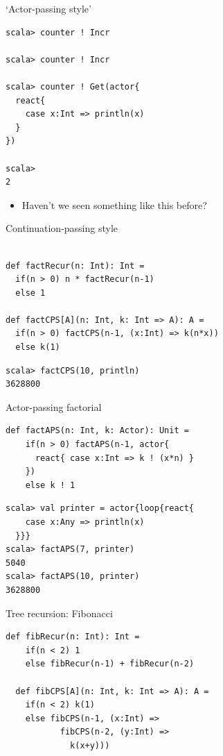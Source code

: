 \documentclass[14pt,t,usepdftitle=false,
xcolornames=x11names,svgnames,dvipsnames]{beamer}
\begin{document}
\begin{frame}[fragile]{`Actor-passing style'}
  \begin{lstlisting}[style=scalarepl]
scala> counter ! Incr

scala> counter ! Incr

scala> counter ! Get(actor{
  react{
    case x:Int => println(x)
  }
})

scala>
2
  \end{lstlisting}
  \begin{itemize}
  \item Haven't we seen something like this before?
  \end{itemize}
\end{frame}

\begin{frame}[fragile]{Continuation-passing style}
  \begin{lstlisting}[style=scala]

def factRecur(n: Int): Int =
  if(n > 0) n * factRecur(n-1)
  else 1

def factCPS[A](n: Int, k: Int => A): A =
  if(n > 0) factCPS(n-1, (x:Int) => k(n*x))
  else k(1)
  \end{lstlisting}
  \begin{lstlisting}[style=scalarepl]
scala> factCPS(10, println)
3628800
  \end{lstlisting}
\end{frame}

\begin{frame}[fragile]{Actor-passing factorial}
  \begin{lstlisting}[style=scala]
  def factAPS(n: Int, k: Actor): Unit =
    if(n > 0) factAPS(n-1, actor{
      react{ case x:Int => k ! (x*n) }
    })
    else k ! 1
  \end{lstlisting}
  \begin{lstlisting}[style=scalarepl]
scala> val printer = actor{loop{react{
    case x:Any => println(x)
  }}}
scala> factAPS(7, printer)
5040
scala> factAPS(10, printer)
3628800
  \end{lstlisting}
\end{frame}

\begin{frame}[fragile]{Tree recursion: Fibonacci}
  \begin{lstlisting}[style=scala]
  def fibRecur(n: Int): Int =
    if(n < 2) 1
    else fibRecur(n-1) + fibRecur(n-2)

  def fibCPS[A](n: Int, k: Int => A): A =
    if(n < 2) k(1)
    else fibCPS(n-1, (x:Int) =>
           fibCPS(n-2, (y:Int) =>
             k(x+y)))
  \end{lstlisting}
\end{frame}
\end{document}
